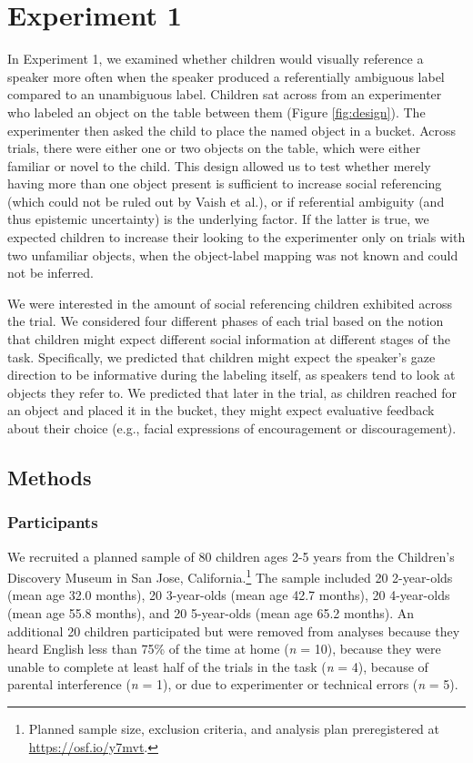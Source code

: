 \documentclass[a4paper,man,apacite,floatsintext]{apa6}
\begin{document}
\section{Experiment 1}\label{experiment-1}

In Experiment 1, we examined whether children would visually reference a
speaker more often when the speaker produced a referentially ambiguous
label compared to an unambiguous label. Children sat across from an
experimenter who labeled an object on the table between them (Figure
\ref{fig:design}). The experimenter then asked the child to place the
named object in a bucket. Across trials, there were either one or two
objects on the table, which were either familiar or novel to the child.
This design allowed us to test whether merely having more than one
object present is sufficient to increase social referencing (which could
not be ruled out by Vaish et al.), or if referential ambiguity (and thus
epistemic uncertainty) is the underlying factor. If the latter is true,
we expected children to increase their looking to the experimenter only
on trials with two unfamiliar objects, when the object-label mapping was
not known and could not be inferred.

We were interested in the amount of social referencing children
exhibited across the trial. We considered four different phases of each
trial based on the notion that children might expect different social
information at different stages of the task. Specifically, we predicted
that children might expect the speaker's gaze direction to be
informative during the labeling itself, as speakers tend to look at
objects they refer to. We predicted that later in the trial, as children
reached for an object and placed it in the bucket, they might expect
evaluative feedback about their choice (e.g., facial expressions of
encouragement or discouragement).

\subsection{Methods}\label{methods}

\subsubsection{Participants}\label{participants}

We recruited a planned sample of 80 children ages 2-5 years from the
Children's Discovery Museum in San Jose, California.\footnote{Planned
  sample size, exclusion criteria, and analysis plan preregistered at
  \url{https://osf.io/y7mvt}.} The sample included 20 2-year-olds (mean
age 32.0 months), 20 3-year-olds (mean age 42.7 months), 20 4-year-olds
(mean age 55.8 months), and 20 5-year-olds (mean age 65.2 months). An
additional 20 children participated but were removed from analyses
because they heard English less than 75\% of the time at home (\emph{n}
= 10), because they were unable to complete at least half of the trials
in the task (\emph{n} = 4), because of parental interference (\emph{n} =
1), or due to experimenter or technical errors (\emph{n} = 5).
\end{document}
